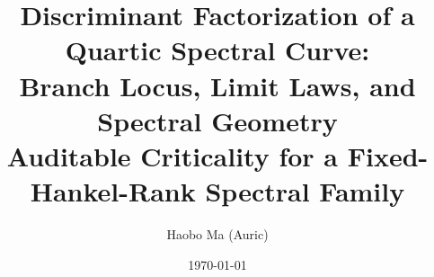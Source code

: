 \documentclass[11pt,letterpaper]{article}
\title{Discriminant Factorization of a Quartic Spectral Curve:\\ Branch Locus, Limit Laws, and Spectral Geometry\\\large Auditable Criticality for a Fixed-Hankel-Rank Spectral Family}
\author{Haobo Ma (Auric)}
\date{\today}
\theoremstyle{plain}
\theoremstyle{definition}
\theoremstyle{remark}
\begin{document}
\sloppy
\maketitle












\FloatBarrier
\appendix







\FloatBarrier

\end{document}
